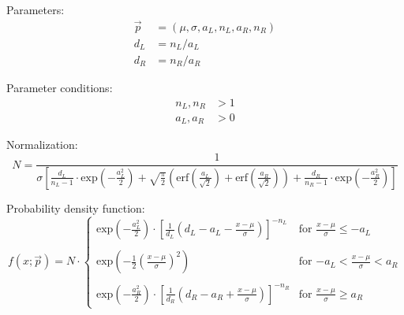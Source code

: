 Parameters:
\begin{align}
\vec{p} &= (\mu,\sigma,a_{L},n_{L},a_{R},n_{R}) \\
d_{L} &= n_{L}/a_{L} \\
d_{R} &= n_{R}/a_{R}
\end{align}

Parameter conditions:
\begin{align}
n_{L}, n_{R} &> 1\\
a_{L}, a_{R} &> 0
\end{align}

Normalization:
\begin{equation}
N = \frac{1}{\sigma\left[\frac{d_{L}}{n_{L}-1} \cdot \text{exp}\left(-\frac{a_{L}^{2}}{2}\right) + \sqrt{\frac{\pi}{2}}\left(\text{erf}\left(\frac{a_{L}}{\sqrt{2}}\right)+\text{erf}\left(\frac{a_{R}}{\sqrt{2}}\right)\right) + \frac{d_{R}}{n_{R}-1} \cdot \text{exp}\left(-\frac{a_{R}^{2}}{2}\right)  \right]}
\end{equation}

Probability density function:
\begin{equation}
f(x;\vec{p}) = N \cdot \begin{cases}
\text{exp}\left(-\frac{a_{L}^{2}}{2}\right) \cdot \left[\frac{1}{d_{L}}\left(d_{L} - a_{L} - \frac{x-\mu}{\sigma}\right)\right]^{-n_{L}} & \text{for $\frac{x-\mu}{\sigma} \leq -a_{L}$} \\
\\
\text{exp}\left(-\frac{1}{2}\left(\frac{x-\mu}{\sigma}\right)^2\right) & \text{for $-a_{L} < \frac{x-\mu}{\sigma} < a_{R}$} \\
\\
\text{exp}\left(-\frac{a_{R}^{2}}{2}\right) \cdot \left[\frac{1}{d_{R}}\left(d_{R} - a_{R} + \frac{x-\mu}{\sigma}\right)\right]^{-n_{R}} & \text{for $\frac{x-\mu}{\sigma} \geq a_{R}$}
\end{cases}
\end{equation}
\newpage

